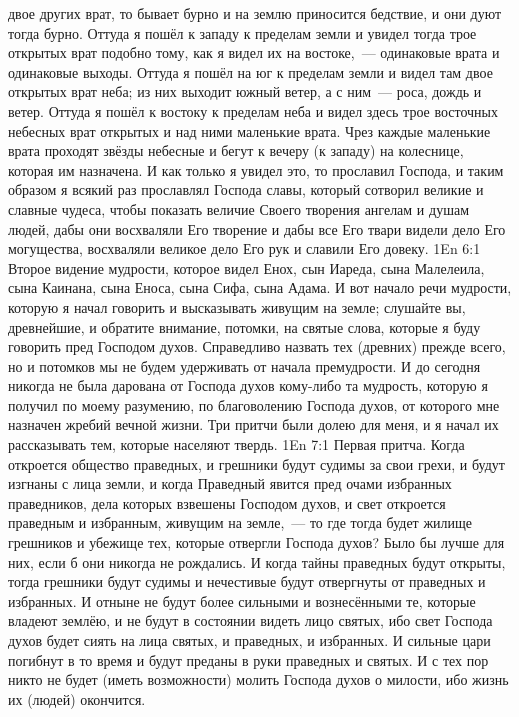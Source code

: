двое других врат, то бывает бурно и на землю приносится бедствие, и они дуют
тогда бурно.
Оттуда я пошёл к западу к пределам земли и увидел тогда трое
открытых врат подобно тому, как я видел их на востоке,~--- одинаковые врата и
одинаковые выходы.
Оттуда я пошёл на юг к пределам земли и видел там двое открытых
врат неба; из них выходит южный ветер, а с ним~--- роса, дождь и ветер.
Оттуда я пошёл к востоку к пределам неба и видел здесь трое восточных
небесных врат открытых и над ними маленькие врата.
Чрез каждые маленькие врата проходят звёзды небесные и бегут к вечеру
(к западу) на колеснице, которая им назначена.
И как только я увидел это, то прославил Господа, и таким образом я
всякий раз прославлял Господа славы, который сотворил великие и славные чудеса,
чтобы показать величие Своего творения ангелам и душам людей, дабы они
восхваляли Его творение и дабы все Его твари видели дело Его могущества,
восхваляли великое дело Его рук и славили Его довеку.
\vs 1En 6:1
Второе видение мудрости, которое видел Енох, сын Иареда, сына
Малелеила, сына Каинана, сына Еноса, сына Сифа, сына Адама.
И вот начало речи мудрости,  которую я начал говорить и высказывать
живущим на земле; слушайте вы, древнейшие, и обратите внимание, потомки, на
святые слова, которые я буду говорить пред Господом духов.
Справедливо назвать тех (древних) прежде всего, но и потомков мы не
будем удерживать от начала премудрости.
И до сегодня никогда не была дарована от Господа духов кому-либо та
мудрость, которую я получил по моему разумению, по благоволению
Господа духов, от которого мне назначен жребий вечной жизни.
Три притчи были долею для меня, и я начал их рассказывать тем, которые
населяют твердь.
\vs 1En 7:1
Первая притча.
Когда откроется общество праведных, и грешники будут судимы за свои
грехи, и будут изгнаны с лица земли, и когда Праведный явится пред очами
избранных праведников, дела которых взвешены Господом духов, и свет откроется
праведным и избранным, живущим на земле,~--- то где тогда будет жилище грешников
и убежище тех, которые отвергли Господа духов?
Было бы лучше для них, если б они никогда не рождались.
И когда тайны праведных будут открыты, тогда грешники будут судимы и
нечестивые будут отвергнуты от праведных и избранных.
И отныне не будут более сильными и вознесёнными те, которые владеют
землёю, и не будут в состоянии видеть лицо святых, ибо свет Господа духов будет
сиять на лица святых, и праведных, и избранных.
И сильные цари погибнут в то время и будут преданы в руки праведных и
святых.
И с тех пор никто не будет (иметь возможности) молить Господа духов о
милости, ибо жизнь их (людей) окончится.
